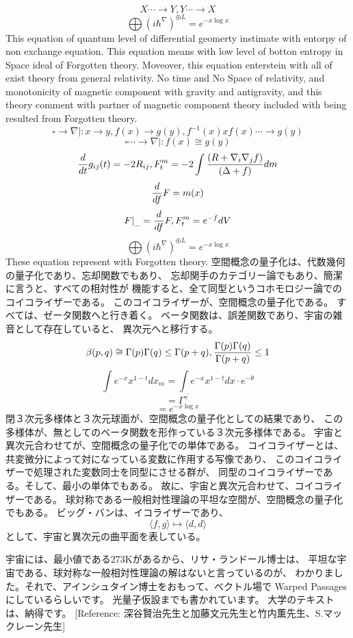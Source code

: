 \documentclass{jsarticle}
\begin{document}
   $$ X \dotsi \to Y, Y \dotsi \to X $$
   $$ \bigoplus(i \hbar^{\nabla})^{\oplus L} = e^{-x \log x} $$
   This equation of quantum level of differential geomerty
   instimate with entorpy of non exchange equation.
   This equation means with low level of botton entropy in Space ideal of
   Forgotten theory. Moveover, this equation enterstein with all of exist
   theory from general relativity.
   No time and No Space of relativity, and monotonicity of magnetic component
   with gravity and antigravity, and this theory comment with partner of
   magnetic component theory included with being resulted from Forgotten
   theory.
   $$ \square \to \nabla |: x \to y, f(x) \to g(y), f^{-1}(x)xf(x) 
   \dotsi \to g(y) $$
   $$ \square \dotsi \to \nabla |: f(x) \cong g(y) $$
   $$ {d \over dt}g_{ij}(t) = - 2 R_{ij}, F^m_t = -2\int{{(R + \nabla_i \nabla
   _j f)} \over {(\Delta + f)}}dm $$
   $$ {d \over df}F = m(x) $$
   $$ F|_{\_} = {d \over df}F, F^m_t = e^{-f}dV $$
   $$ \bigoplus(i \hbar^{\nabla})^{\oplus L} = e^{-x \log x} $$
   These equation represent with Forgotten theory.
   空間概念の量子化は、代数幾何の量子化であり、忘却関数でもあり、
   忘却関手のカテゴリー論でもあり、簡潔に言うと、すべての相対性が
   機能すると、全て同型というコホモロジー論でのコイコライザーである。
   このコイコライザーが、空間概念の量子化である。
   すべては、ゼータ関数へと行き着く。
   ベータ関数は、誤差関数であり、宇宙の雑音として存在していると、
   異次元へと移行する。
   $$ \beta(p,q) \cong {\Gamma(p)\Gamma(q) \le \Gamma(p+q)}, 
   {{\Gamma(p)\Gamma(q)} \over \Gamma(p+q)} \le 1 $$
   $$ \int e^{-x}x^{1-t}dx_m = \int e^{-x}x^{1-t}dx\cdot e^{-\theta} $$
   $$ = \Gamma^{{\gamma}^{'}} $$
   $$ = e^{-x \log x} $$
   閉３次元多様体と３次元球面が、空間概念の量子化としての結果であり、
   この多様体が、無としてのベータ関数を形作っている３次元多様体である。
   宇宙と異次元合わせてが、空間概念の量子化での単体である。
   コイコライザーとは、共変微分によって対になっている変数に作用する写像であり、
   このコイコライザーで処理された変数同士を同型にさせる群が、
   同型のコイコライザーである。そして、最小の単体でもある。
   故に、宇宙と異次元合わせて、コイコライザーである。
   球対称である一般相対性理論の平坦な空間が、空間概念の量子化でもある。
   ビッグ・バンは、イコライザーであり、
   $$ \langle f,g\rangle \mapsto \langle d,d\rangle $$
   として、宇宙と異次元の曲平面を表している。
 
   宇宙には、最小値である273Kがあるから、リサ・ランドール博士は、
   平坦な宇宙である、球対称な一般相対性理論の解はないと言っているのが、
   わかりました。それで、アインシュタイン博士をおもって、ベクトル場で
   Warped Passagesにしているらしいです。
   光量子仮設までも書かれています。
   大学のテキストは、納得です。
   [Reference: 深谷賢治先生と加藤文元先生と竹内薫先生、S.マックレーン先生]
\end{document}
